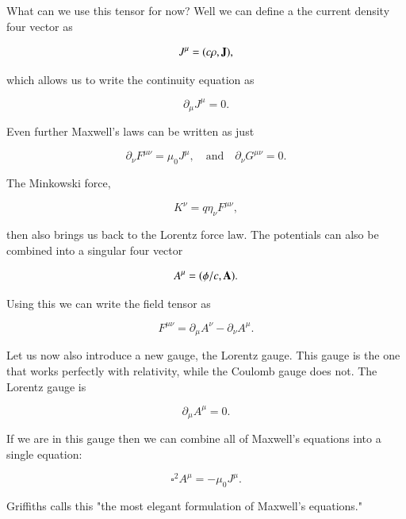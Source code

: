 \documentclass[preprint, review,12pt]{elsarticle}
\def\b{\textbf}
\def\and{\quad \text{and} \quad}
\begin{document}
What can we use this tensor for now? Well we can define a the current density four vector as 

\begin{equation}
    J^\mu = (c\rho, \b J),
\end{equation}

which allows us to write the continuity equation as 

\begin{equation}
    \partial_\mu J^\mu = 0.
\end{equation}

Even further Maxwell's laws can be written as just 

\begin{equation}
    \partial_\nu F^{\mu\nu} = \mu_0 J^\mu, \and \partial_\nu G^{\mu\nu} = 0.
\end{equation}

The Minkowski force,

\begin{equation}
    K^\nu = q\eta_\nu F^{\mu\nu},
\end{equation}

then also brings us back to the Lorentz force law. The potentials can also be combined into a singular four vector

\begin{equation}
    A^\mu = (\phi/c, \b A).
\end{equation}

Using this we can write the field tensor as 

\begin{equation}
    F^{\mu\nu} = \partial_\mu A^\nu - \partial_\nu A^\mu.
\end{equation}

Let us now also introduce a new gauge, the Lorentz gauge. This gauge is the one that works perfectly with relativity, while the Coulomb gauge does not. The Lorentz gauge is 

\begin{equation}
    \partial_\mu A^\mu = 0.
\end{equation}

If we are in this gauge then we can combine all of Maxwell's equations into a single equation:

\begin{equation}
    \square^2 A^\mu = - \mu_0 J^\mu.
\end{equation}

Griffiths calls this "the most elegant formulation of Maxwell's equations."
\end{document}
